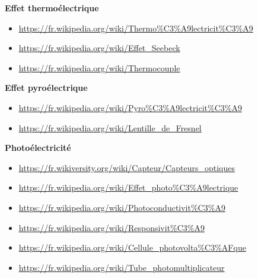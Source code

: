 \documentclass{article}
\begin{document}
    \textbf{Effet thermoélectrique}
    \begin{itemize}
        \item \url{https://fr.wikipedia.org/wiki/Thermo%C3%A9lectricit%C3%A9}
        \item \url{https://fr.wikipedia.org/wiki/Effet_Seebeck}
        \item \url{https://fr.wikipedia.org/wiki/Thermocouple}
    \end{itemize}
    \bigskip

    \textbf{Effet pyroélectrique}
    \begin{itemize}
        \item \url{https://fr.wikipedia.org/wiki/Pyro%C3%A9lectricit%C3%A9}
        \item \url{https://fr.wikipedia.org/wiki/Lentille_de_Fresnel}
    \end{itemize}
    \bigskip

    \textbf{Photoélectricité}
    \begin{itemize}
        \item \url{https://fr.wikiversity.org/wiki/Capteur/Capteurs_optiques}
        \item \url{https://fr.wikipedia.org/wiki/Effet_photo%C3%A9lectrique}
        \item \url{https://fr.wikipedia.org/wiki/Photoconductivit%C3%A9}
        \item \url{https://fr.wikipedia.org/wiki/Responsivit%C3%A9}
        \item \url{https://fr.wikipedia.org/wiki/Cellule_photovolta%C3%AFque}
        \item \url{https://fr.wikipedia.org/wiki/Tube_photomultiplicateur}
    \end{itemize}

\end{document}
